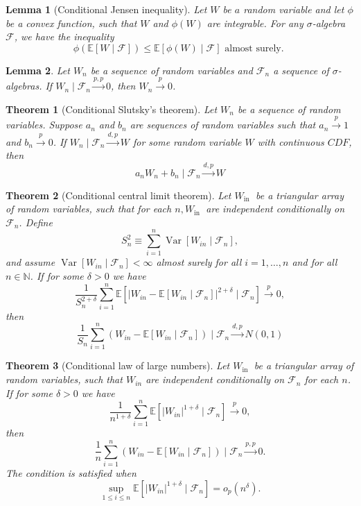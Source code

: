 \documentclass[12pt]{article}
\newtheorem{theorem}{Theorem}
\newtheorem{lemma}{Lemma}
\theoremstyle{definition}
\theoremstyle{remark}
\begin{document}
\begin{lemma}[Conditional Jensen inequality]\label{lemma:conditional-jensen} Let $W$ be $a$ random variable and let $\phi$ be a convex function, such that $W$ and $\phi(W)$ are integrable. For any $\sigma$-algebra $\mathcal{F}$, we have the inequality
	$$
	\phi(\mathbb{E}[W \mid \mathcal{F}]) \leq \mathbb{E}[\phi(W) \mid \mathcal{F}] \text { almost surely. }
	$$
\end{lemma}
\begin{lemma}\label{lemma:pp-to-p-convergence}
	Let $W_n$ be a sequence of random variables and $\mathcal{F}_n$ a sequence of $\sigma$-algebras. If $W_n \mid \mathcal{F}_n \xrightarrow{p, p} 0$, then $W_n \xrightarrow{p} 0$.
\end{lemma}
\begin{theorem}[Conditional Slutsky's theorem] \label{thm:conditional-slutskys-thoerem}
	Let $W_n$ be a sequence of random variables. Suppose $a_n$ and $b_n$ are sequences of random variables such that $a_n \stackrel{p}{\rightarrow} 1$ and $b_n \stackrel{p}{\rightarrow} 0$. If $W_n \mid \mathcal{F}_n \xrightarrow{d, p} W$ for some random variable $W$ with continuous $C D F$, then
	$$
	a_n W_n+b_n \mid \mathcal{F}_n \stackrel{d, p}{\longrightarrow} W
	$$
\end{theorem}
\begin{theorem}[Conditional central limit theorem]\label{thm:conditional-clt}
	Let $W_{\text {in }}$ be a triangular array of random variables, such that for each $n, W_{\text {in }}$ are independent conditionally on $\mathcal{F}_n$. Define
	$$
	S_n^2 \equiv \sum_{i=1}^n \operatorname{Var}\left[W_{i n} \mid \mathcal{F}_n\right],
	$$
	and assume $\operatorname{Var}\left[W_{i n} \mid \mathcal{F}_n\right]<\infty$ almost surely for all $i=1, \ldots, n$ and for all $n \in \mathbb{N}$. If for some $\delta>0$ we have
	$$
	\frac{1}{S_n^{2+\delta}} \sum_{i=1}^n \mathbb{E}\left[\left|W_{i n}-\mathbb{E}\left[W_{i n} \mid \mathcal{F}_n\right]\right|^{2+\delta} \mid \mathcal{F}_n\right] \stackrel{p}{\rightarrow} 0,
	$$
	then
	$$
	\frac{1}{S_n} \sum_{i=1}^n\left(W_{i n}-\mathbb{E}\left[W_{i n} \mid \mathcal{F}_n\right]\right) \mid \mathcal{F}_n \stackrel{d, p}{\longrightarrow} N(0,1)
	$$
\end{theorem}
\begin{theorem}[Conditional law of large numbers]\label{thm:conditional-wlln} Let $W_{\text {in }}$ be a triangular array of random variables, such that $W_{i n}$ are independent conditionally on $\mathcal{F}_n$ for each $n$. If for some $\delta>0$ we have
	$$
	\frac{1}{n^{1+\delta}} \sum_{i=1}^n \mathbb{E}\left[\left|W_{i n}\right|^{1+\delta} \mid \mathcal{F}_n\right] \xrightarrow{p} 0,
	$$
	then
	$$
	\frac{1}{n} \sum_{i=1}^n\left(W_{i n}-\mathbb{E}\left[W_{i n} \mid \mathcal{F}_n\right]\right) \mid \mathcal{F}_n \xrightarrow{p, p} 0 .
	$$
	The condition is satisfied when
	$$
	\sup _{1 \leq i \leq n} \mathbb{E}\left[\left|W_{i n}\right|^{1+\delta} \mid \mathcal{F}_n\right]=o_p\left(n^\delta\right) .
	$$
\end{theorem}
\end{document}
